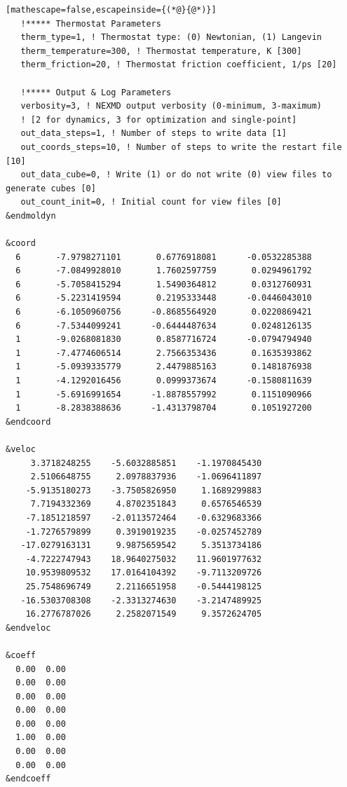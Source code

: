 \documentclass[letterpaper,12pt,titlepage]{article}
\begin{document}
\begin{appendix}
\begin{lstlisting}[mathescape=false,escapeinside={(*@}{@*)}]
   !***** Thermostat Parameters
   therm_type=1, ! Thermostat type: (0) Newtonian, (1) Langevin
   therm_temperature=300, ! Thermostat temperature, K [300]
   therm_friction=20, ! Thermostat friction coefficient, 1/ps [20]

   !***** Output & Log Parameters
   verbosity=3, ! NEXMD output verbosity (0-minimum, 3-maximum)
   ! [2 for dynamics, 3 for optimization and single-point]
   out_data_steps=1, ! Number of steps to write data [1]
   out_coords_steps=10, ! Number of steps to write the restart file [10]
   out_data_cube=0, ! Write (1) or do not write (0) view files to generate cubes [0]
   out_count_init=0, ! Initial count for view files [0]
&endmoldyn

&coord
  6       -7.9798271101       0.6776918081      -0.0532285388
  6       -7.0849928010       1.7602597759       0.0294961792
  6       -5.7058415294       1.5490364812       0.0312760931
  6       -5.2231419594       0.2195333448      -0.0446043010
  6       -6.1050960756      -0.8685564920       0.0220869421
  6       -7.5344099241      -0.6444487634       0.0248126135
  1       -9.0268081830       0.8587716724      -0.0794794940
  1       -7.4774606514       2.7566353436       0.1635393862
  1       -5.0939335779       2.4479885163       0.1481876938
  1       -4.1292016456       0.0999373674      -0.1580811639
  1       -5.6916991654      -1.8878557992       0.1151090966
  1       -8.2838388636      -1.4313798704       0.1051927200
&endcoord

&veloc
     3.3718248255    -5.6032885851    -1.1970845430
     2.5106648755     2.0978837936    -1.0696411897
    -5.9135180273    -3.7505826950     1.1689299883
     7.7194332369     4.8702351843     0.6576546539
    -7.1851218597    -2.0113572464    -0.6329683366
    -1.7276579899     0.3919019235    -0.0257452789
   -17.0279163131     9.9875659542     5.3513734186
    -4.7222747943    18.9640275032    11.9601977632
    10.9539809532    17.0164104392    -9.7113209726
    25.7548696749     2.2116651958    -0.5444198125
   -16.5303708308    -2.3313274630    -3.2147489925
    16.2776787026     2.2582071549     9.3572624705
&endveloc

&coeff
  0.00  0.00
  0.00  0.00
  0.00  0.00
  0.00  0.00
  0.00  0.00
  1.00  0.00
  0.00  0.00
  0.00  0.00
&endcoeff
\end{lstlisting}
\newpage

\end{appendix}
\end{document}
